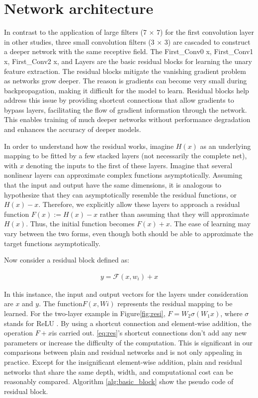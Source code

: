 \documentclass[english, LaM, oneside]{sapthesis}%
\begin{document}
\section{Network architecture}
In contrast to the application of large filters (7 × 7) for the first convolution layer in other studies, three small convolution filters (3 × 3) are cascaded to construct a deeper network with the same receptive field. The First\_Conv0 x, First\_Conv1 x, First\_Conv2 x, and Layers are the basic residual blocks \cite{residual} for learning the unary feature extraction. The residual blocks mitigate the vanishing gradient problem as networks grow deeper. The reason is gradients can become very small during backpropagation, making it difficult for the model to learn. Residual blocks help address this issue by providing shortcut connections that allow gradients to bypass layers, facilitating the flow of gradient information through the network. This enables training of much deeper networks without performance degradation and enhances the accuracy of deeper models. 

In order to understand how the residual works, imagine $H(x)$ as an underlying mapping to be fitted by a few stacked layers (not necessarily the complete net), with $x$ denoting the inputs to the first of these layers. Imagine that several nonlinear layers can approximate complex functions asymptotically. Assuming that the input and output have the same dimensions, it is analogous to hypothesize that they can asymptotically resemble the residual functions, or $H(x)-x$. Therefore, we explicitly allow these layers to approach a residual function $F(x) := H(x) - x$ rather than assuming that they will approximate $H(x)$. Thus, the initial function becomes $F(x)+x$. The ease of learning may vary between the two forms, even though both should be able to approximate the target functions asymptotically. 

Now consider a residual block defined as:

\begin{equation}\label{eq:res}
\begin{flalign*}
         y = \mathcal{F}(x,{w_i}) + x
    \end{flalign*}
\end{equation}

In this instance, the input and output vectors for the layers under consideration are $x$ and $y$. The function$ F(x, Wi)$ represents the residual mapping to be learned. For the two-layer example in Figure\ref{fig:resi}, $F = W_2 \sigma(W_1x)$, where $\sigma$ stands for ReLU \cite{relu}. By using a shortcut connection and element-wise addition, the operation $F + x $is carried out. 
\ref{eq:res}'s shortcut connections don't add any new parameters or increase the difficulty of the computation. This is significant in our comparisons between plain and residual networks and is not only appealing in practice. Except for the insignificant element-wise addition, plain and residual networks that share the same depth, width, and computational cost can be reasonably compared. Algorithm \ref{alg:basic_block} show the pseudo code of residual block. 
\end{document}
